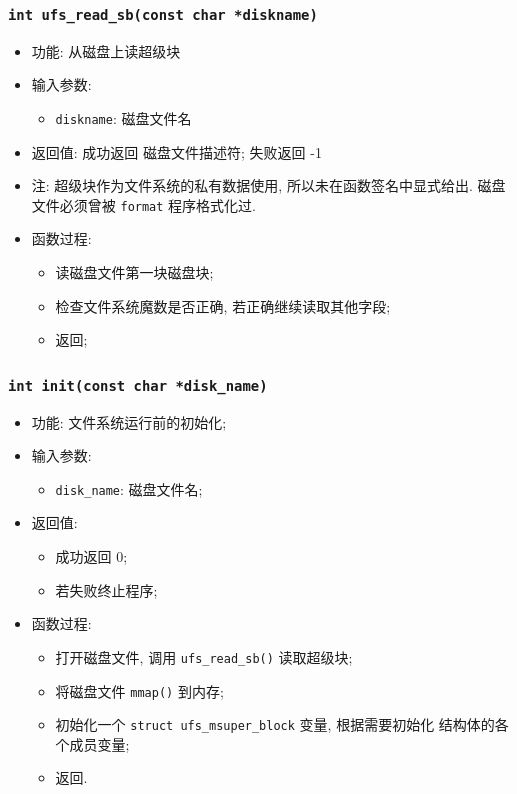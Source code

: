 \documentclass[nofonts]{ctexart}
\begin{document}
\subsubsection{\texttt{int ufs\_read\_sb(const char *diskname)}}
\begin{itemize}
\item
  功能: 从磁盘上读超级块
\item
  输入参数:

  \begin{itemize}
  \item
    \texttt{diskname}: 磁盘文件名
  \end{itemize}
\item
  返回值: 成功返回 磁盘文件描述符; 失败返回 -1
\item
  注: 超级块作为文件系统的私有数据使用, 所以未在函数签名中显式给出.
  磁盘文件必须曾被 \texttt{format} 程序格式化过.
\item
  函数过程:

  \begin{itemize}
  \item
    读磁盘文件第一块磁盘块;
  \item
    检查文件系统魔数是否正确, 若正确继续读取其他字段;
  \item
    返回;
  \end{itemize}
\end{itemize}
        \subsubsection{\texttt{int init(const char *disk\_name)}}
        \begin{itemize}
\item
  功能: 文件系统运行前的初始化;
\item
  输入参数:

  \begin{itemize}
  \item
    \texttt{disk\_name}: 磁盘文件名;
  \end{itemize}
\item
  返回值:

  \begin{itemize}
  \item
    成功返回 0;
  \item
    若失败终止程序;
  \end{itemize}
\item
  函数过程:

  \begin{itemize}
  \item
    打开磁盘文件, 调用 \texttt{ufs\_read\_sb()} 读取超级块;
  \item
    将磁盘文件 \texttt{mmap()} 到内存;
  \item
    初始化一个 \texttt{struct ufs\_msuper\_block} 变量, 根据需要初始化
    结构体的各个成员变量;
  \item
    返回.
  \end{itemize}
  \end{itemize}
\end{document}
